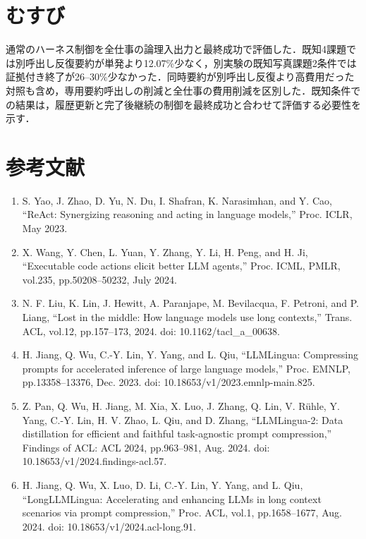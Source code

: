 \documentclass{article}
\begin{document}
\section{むすび}
通常のハーネス制御を全仕事の論理入出力と最終成功で評価した．既知4課題では別呼出し反復要約が単発より12.07\%少なく，別実験の既知写真課題2条件では証拠付き終了が26--30\%少なかった．同時要約が別呼出し反復より高費用だった対照も含め，専用要約呼出しの削減と全仕事の費用削減を区別した．既知条件での結果は，履歴更新と完了後継続の制御を最終成功と合わせて評価する必要性を示す．

\section*{参考文献}
\begin{enumerate}
\item S. Yao, J. Zhao, D. Yu, N. Du, I. Shafran, K. Narasimhan, and Y. Cao,
``ReAct: Synergizing reasoning and acting in language models,''
Proc. ICLR, May 2023.

\item X. Wang, Y. Chen, L. Yuan, Y. Zhang, Y. Li, H. Peng, and H. Ji,
``Executable code actions elicit better LLM agents,''
Proc. ICML, PMLR, vol.235, pp.50208--50232, July 2024.

\item N. F. Liu, K. Lin, J. Hewitt, A. Paranjape, M. Bevilacqua, F. Petroni, and P. Liang,
``Lost in the middle: How language models use long contexts,''
Trans. ACL, vol.12, pp.157--173, 2024.
doi: 10.1162/tacl\_a\_00638.

\item H. Jiang, Q. Wu, C.-Y. Lin, Y. Yang, and L. Qiu,
``LLMLingua: Compressing prompts for accelerated inference of large language models,''
Proc. EMNLP, pp.13358--13376, Dec. 2023.
doi: 10.18653/v1/2023.emnlp-main.825.

\item Z. Pan, Q. Wu, H. Jiang, M. Xia, X. Luo, J. Zhang, Q. Lin, V. R\"uhle,
Y. Yang, C.-Y. Lin, H. V. Zhao, L. Qiu, and D. Zhang,
``LLMLingua-2: Data distillation for efficient and faithful task-agnostic prompt compression,''
Findings of ACL: ACL 2024, pp.963--981, Aug. 2024.
doi: 10.18653/v1/2024.findings-acl.57.

\item H. Jiang, Q. Wu, X. Luo, D. Li, C.-Y. Lin, Y. Yang, and L. Qiu,
``LongLLMLingua: Accelerating and enhancing LLMs in long context scenarios via prompt compression,''
Proc. ACL, vol.1, pp.1658--1677, Aug. 2024.
doi: 10.18653/v1/2024.acl-long.91.


\end{enumerate}
\end{document}
